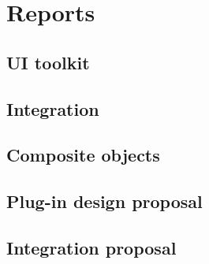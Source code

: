 \chapter{Reports}

\section{UI toolkit}


\section{Integration}


\section{Composite objects}


\section{Plug-in design proposal}


\section{Integration proposal}


\graphicspath{ {../07-reports/} }


